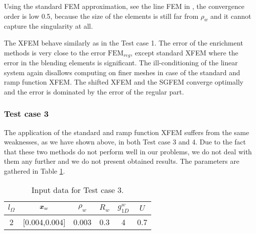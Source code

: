 Using the standard FEM approximation, see the line FEM in , the convergence order is low 0.5,
because the size of the elements is still far from $\rho_w$ and it cannot capture the singularity at all.

The XFEM behave similarly as in the Test case 1. The error of the enrichment methods is very close to the error $\textrm{FEM}_{reg}$,
except standard XFEM where the error in the blending elements is significant. The ill-conditioning of the linear system again 
disallows computing on finer meshes in case of the standard and ramp function XFEM.
The shifted XFEM and the SGFEM converge optimally and the error is dominated by the error of the regular part.


\subsubsection{Test case 3}
The application of the standard and ramp function XFEM suffers from the same weaknesses, as we have shown above, in both Test case 3 and 4.
Due to the fact that these two methods do not perform well in our problems, we do not deal with them any further
and we do not present obtained results.
The parameters are gathered in Table \ref{tab:test_case_3_data}.
%
\begin{table}[!htb]
\begin{center}
\begin{tabular}{cccccc}
\toprule
$l_\Omega$ & $\mathbf{\boldsymbol{x}}_w$  & $\rho_w$ & $R_w$ & $g^w_{1D}$ & $U$ \\
\midrule
2 & [0.004,0.004] & 0.003 & 0.3 & 4 & 0.7\\
\bottomrule
\end{tabular}
\caption{Input data for Test case 3.}
\label{tab:test_case_3_data}
\end{center}
\end{table}
%

